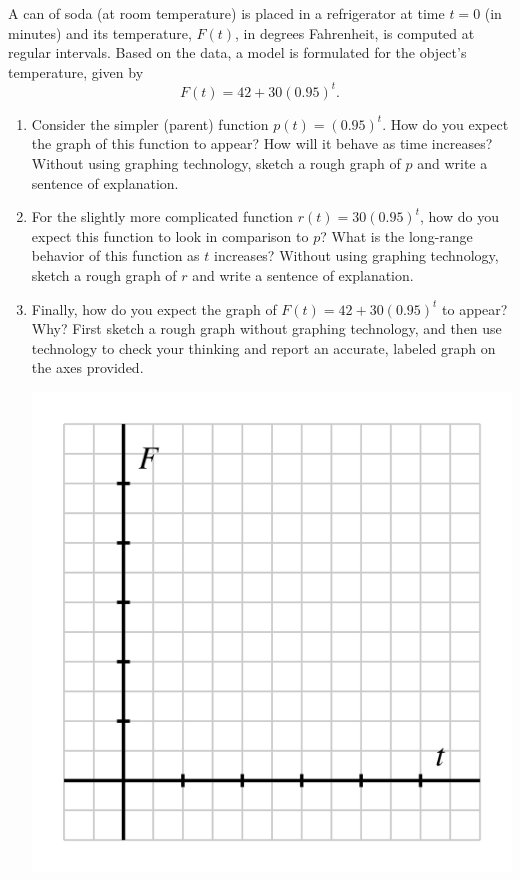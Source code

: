 \documentclass[nooutcomes]{ximera}
\begin{document}
\begin{exploration}
A can of soda (at room temperature) is placed in a refrigerator at time $t = 0$ (in minutes) and its temperature, $F(t)$, in degrees Fahrenheit, is computed at regular intervals. Based on the data, a model is formulated for the object's temperature, given by
\begin{equation*}
F(t) = 42 + 30(0.95)^{t}\text{.}
\end{equation*}
\begin{enumerate}[label=\alph*.]
\item Consider the simpler (parent) function $p(t) = (0.95)^t$. How do you expect the graph of this function to appear? How will it behave as time increases? Without using graphing technology, sketch a rough graph of $p$ and write a sentence of explanation.
\item For the slightly more complicated function $r(t) = 30 (0.95)^{t}$, how do you expect this function to look in comparison to $p$?  What is the long-range behavior of this function as $t$ increases? Without using graphing technology, sketch a rough graph of $r$ and write a sentence of explanation.
\item Finally, how do you expect the graph of $F(t) = 42 + 30(0.95)^{t}$ to appear? Why?  First sketch a rough graph without graphing technology, and then use technology to check your thinking and report an accurate, labeled graph on the axes provided.
\begin{image}
\includegraphics{modeling-F-t-blank-axes.jpg}

\end{image}
\end{enumerate}
\end{exploration}
\end{document}
